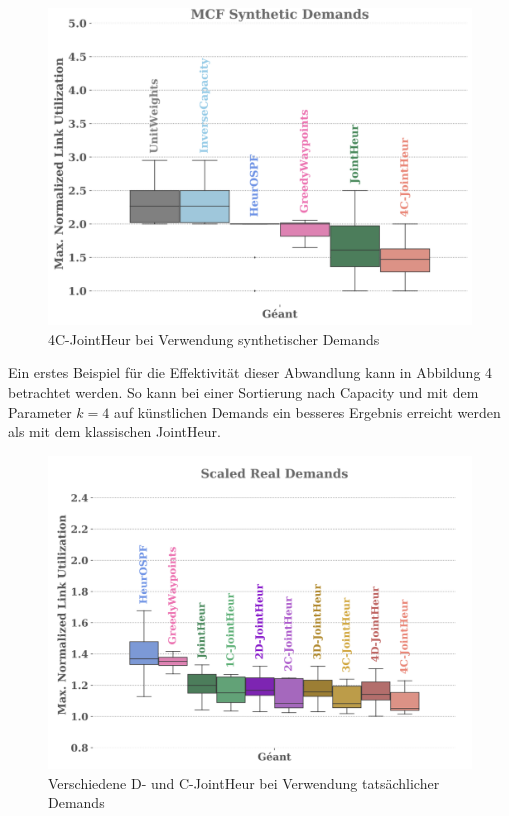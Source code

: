 \documentclass[sigconf,noacm,review]{acmart}
\begin{document}
\begin{figure}[h]
  \centering 
  \includegraphics[width=\linewidth]{abbildungen/PNG-Bild}
  \caption{4C-JointHeur bei Verwendung synthetischer Demands}
 \end{figure}
Ein erstes Beispiel für die Effektivität dieser Abwandlung kann in Abbildung 4 betrachtet werden. So kann bei einer Sortierung nach Capacity und mit dem Parameter $k=4$ auf künstlichen Demands ein besseres Ergebnis erreicht werden als mit dem klassischen JointHeur. 
\begin{figure}[h]
  \centering 
  \includegraphics[width=\linewidth]{abbildungen/PNG-Bild 2}
  \caption{Verschiedene D- und C-JointHeur bei Verwendung tatsächlicher Demands}
\end{figure}
\end{document}
